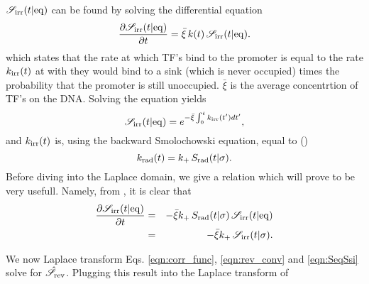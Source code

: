 $\mathscr{S}_{\rm irr}(t|{\rm eq})$ can be found by solving the differential equation
\begin{equation}
 \pdiff{\mathscr{S}_{\rm irr}(t|{\rm eq})}{t} = \bar{\xi} \, k(t) \, \mathscr{S}_{\rm irr}(t|{\rm eq}).
 \elabel{DE_Seq}
\end{equation}
which states that the rate at which TF's bind to the promoter is equal to the rate $k_{{\rm irr}}(t)$ at with they would  bind to a sink (which is never occupied) times the probability that the promoter is still unoccupied. $\bar{\xi}$ is the average concentrtion of TF's on the DNA. Solving the equation yields
\begin{equation}
 \mathscr{S}_{\rm irr}(t|{\rm eq}) = e^{-\bar{\xi}\int_0^t k_{{\rm irr}}(t') dt'},
\end{equation}
and $k_{{\rm irr}}(t)$ is, using the backward Smolochowski equation, equal to ()
\begin{equation}
 k_{\rm rad}(t) = k_+ \, S_{\rm rad}(t|\sigma).
 \elabel{krad}
\end{equation}
Before diving into the Laplace domain, we give a relation which will prove to be very usefull. Namely, from , it is clear that
\begin{eqnarray}
 \pdiff{\mathscr{S}_{\rm irr}(t|{\rm eq})}{t} & = & -\bar{\xi} k_+ \, S_{\rm rad}(t|\sigma) \, \mathscr{S}_{\rm irr}(t|{\rm eq}) \\
 & = & -\bar{\xi} k_+ \, \mathscr{S}_{\rm irr}(t|\sigma).
 \elabel{SeqSsi}
\end{eqnarray}

We now Laplace transform Eqs. \ref{eqn:corr_func}, \ref{eqn:rev_conv} and \ref{eqn:SeqSsi} solve for $\hat{\mathscr{S}}_{{\rm rev}}$. Plugging this result into the Laplace transform of 



